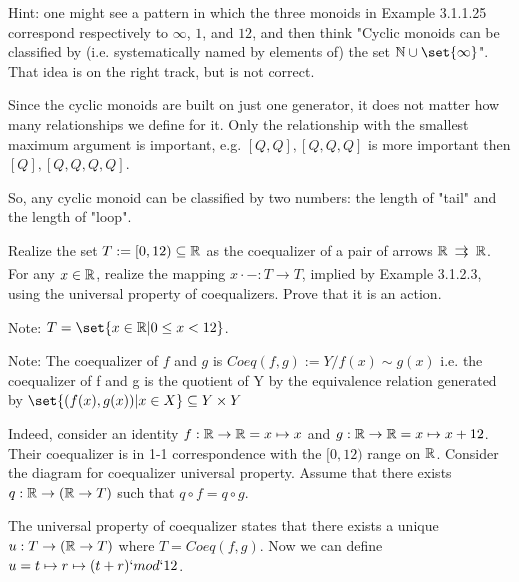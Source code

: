 \documentclass{article}
\begin{document}
Hint: one might see a pattern in which the three monoids in Example 3.1.1.25
correspond respectively to $\infty$, $1$, and $12$, and then think "Cyclic
monoids can be classified by (i.e. systematically named by elements of) the set
$\N \cup \set{\infty}$". That idea is on the right track, but is not correct.

\ans

Since the cyclic monoids are built on just one generator, it does not matter how
many relationships we define for it. Only the relationship with the smallest
maximum argument is important, e.g. $[Q,Q],[Q,Q,Q]$ is more important then
$[Q],[Q,Q,Q,Q]$.

So, any cyclic monoid can be classified by two numbers: the length of
"tail" and the length of "loop".


\es Realize the set $T := [0,12) \subseteq \mathbb{R}$ as the coequalizer of a pair of
    arrows $\Rat \toto \Rat$.
\ei For any $x \in \mathbb{R}$, realize the mapping $x \cdot-: T \to T$, implied by
    Example 3.1.2.3, using the universal property of coequalizers.
\ei Prove that it is an action.
\ee

\ans

Note: $T = \set{x \in \Rat | 0 \leq x < 12}$.

Note: The coequalizer of $f$ and $g$ is $Coeq(f,g) := Y / f(x) \sim g(x)$ i.e.
the coequalizer of f and g is the quotient of Y by the equivalence relation
generated by $\set{(f(x),g(x)) | x \in X} \subseteq Y \times Y$

\es Indeed, consider an identity $f:\mathbb{R} \to \mathbb{R} = x \mapsto x$ and $g:\mathbb{R} \to
    \mathbb{R} = x \mapsto x + 12$. Their coequalizer is in 1-1 correspondence with
    the $[0,12)$ range on $\mathbb{R}$.
\ei Consider the diagram for coequalizer universal property. Assume that there
    exists $q : \mathbb{R} \to (\mathbb{R} \to T)$ such that $q \circ f = q \circ g$.
    \begin{center}
    \end{center}
    The universal property of coequalizer states that there exists a unique $u:
    T \to (\mathbb{R} \to T)$ where $T = Coeq(f,g)$. Now we can define $u = t \mapsto r
    \mapsto (t + r) `mod` 12$.
\end{document}

